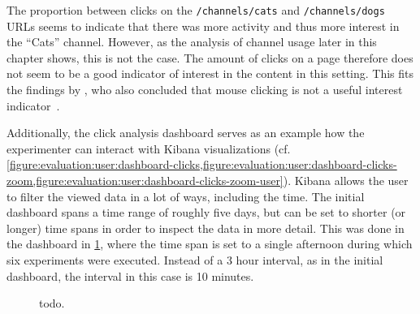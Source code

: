 The proportion between clicks on the \texttt{/channels/cats} and \texttt{/channels/dogs} URLs seems to indicate that there was more activity and thus more interest in the ``Cats'' channel.
However, as the analysis of channel usage later in this chapter shows, this is not the case.
The amount of clicks on a page therefore does not seem to be a good indicator of interest in the content in this setting.
This fits the findings by \cite{Claypool2001}, who also concluded that mouse clicking is not a useful interest indicator~\cite{Claypool2001}.

Additionally, the click analysis dashboard serves as an example how the experimenter can interact with Kibana visualizations (cf. \cref{figure:evaluation:user:dashboard-clicks,figure:evaluation:user:dashboard-clicks-zoom,figure:evaluation:user:dashboard-clicks-zoom-user}).
Kibana allows the user to filter the viewed data in a lot of ways, including the time.
The initial dashboard spans a time range of roughly five days, but can be set to shorter (or longer) time spans in order to inspect the data in more detail.
This was done in the dashboard in \cref{figure:evaluation:user:dashboard-clicks-zoom}, where the time span is set to a single afternoon during which six experiments were executed.
Instead of a 3 hour interval, as in the initial dashboard, the interval in this case is 10 minutes.

\begin{figure}[h]
        \caption{todo.}
        \label{figure:evaluation:user:dashboard-clicks-zoom}
\end{figure}

